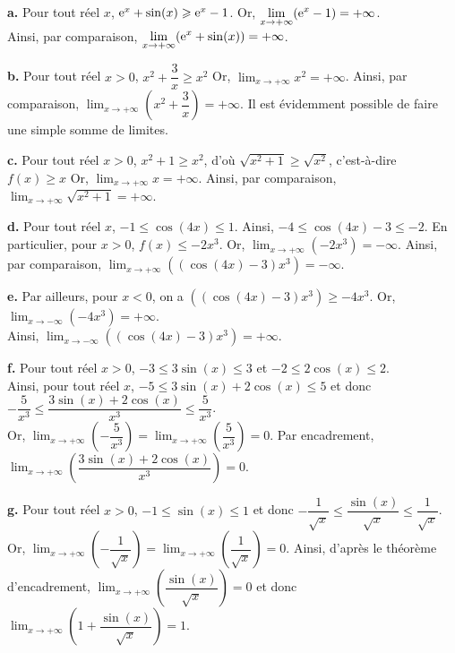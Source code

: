\documentclass[11pt,fleqn, openany]{book} %
\begin{document}
\begin{solution}\textbf{a.} Pour tout réel $x$, $\mathrm{e}^x+\sin(x) \geqslant \mathrm{e}^x -1$. Or, $\displaystyle \lim_{x \to + \infty}(\mathrm{e}^x-1)=+\infty$.\\ Ainsi, par comparaison, $\displaystyle \lim _{x\to + \infty}(\mathrm{e}^x + \sin (x))=+\infty$.

 \textbf{b.} Pour tout réel $x>0$, $x^2+\dfrac{3}{x}\geqslant x^2$ Or, $\displaystyle \lim_{x \to +\infty}x^2=+\infty$. Ainsi, par comparaison, $\displaystyle \lim_{x \to +\infty} \left(x^2+\dfrac{3}{x}\right)=+\infty$. Il est évidemment possible de faire une simple somme de limites. 

 \textbf{c.} Pour tout réel $x>0$, $x^2+1 \geqslant x^2$, d'où $\sqrt{x^2+1} \geqslant \sqrt{x^2}$, c'est-à-dire $f(x)\geqslant x$ Or, $\displaystyle \lim_{x \to +\infty}x=+\infty$. Ainsi, par comparaison, $\displaystyle \lim_{x \to +\infty} \sqrt{x^2+1}=+\infty$.
 
  \textbf{d.} Pour tout réel $x$, $-1\leqslant \cos(4x) \leqslant 1$. Ainsi, $-4 \leqslant \cos(4x)-3 \leqslant -2$. En particulier, pour $x>0$, $f(x) \leqslant -2x^3$. Or, $\displaystyle\lim _{x \to +\infty} (-2x^3)=-\infty$. Ainsi, par comparaison,  $\displaystyle \lim_{x \to +\infty} \left((\cos(4x)-3)x^3\right)=-\infty$.

 \textbf{e.} Par ailleurs, pour $x<0$, on a $\left((\cos(4x)-3)x^3\right) \geqslant -4x^3$. Or, $\displaystyle \lim_{x \to -\infty} (-4x^3)=+\infty$.\\ Ainsi, $\displaystyle \lim_{x \to -\infty} \left((\cos(4x)-3)x^3\right)=+\infty$.

 \textbf{f.} Pour tout réel $x>0$, $-3  \leqslant 3\sin(x) \leqslant 3$ et $-2\leqslant 2\cos(x)\leqslant 2$. \\ Ainsi, pour tout réel $x$, $-5\leqslant 3\sin(x)+2\cos(x) \leqslant 5$ et donc $-\dfrac{5}{x^3} \leqslant \dfrac{3\sin(x)+2\cos(x)}{x^3} \leqslant \dfrac{5}{x^3}$. \\ Or, $\displaystyle\lim_{x\to+\infty}\left(-\dfrac{5}{x^3}\right) = \displaystyle\lim_{x\to+\infty}\left(\dfrac{5}{x^3}\right)=0$. Par encadrement, $\displaystyle\lim_{x\to+\infty}\left(\dfrac{3\sin(x)+2\cos(x)}{x^3}\right)=0$.
 
\textbf{g.} Pour tout réel $x>0$, $-1 \leqslant \sin(x) \leqslant 1$ et donc $-\dfrac{1}{\sqrt{x}} \leqslant \dfrac{\sin(x)}{\sqrt{x}} \leqslant \dfrac{1}{\sqrt{x}}$. \\ Or, $\displaystyle\lim_{x\to+\infty}\left(-\dfrac{1}{\sqrt{x}}\right)=\displaystyle\lim_{x\to+\infty}\left(\dfrac{1}{\sqrt{x}}\right)=0$. Ainsi, d'après le théorème d'encadrement, $\displaystyle\lim_{x\to+\infty}\left(\dfrac{\sin(x)}{\sqrt{x}}\right)=0$ et donc $\displaystyle\lim_{x\to+\infty}\left(1+\dfrac{\sin(x)}{\sqrt{x}}\right)=1$.
  

\end{solution}
\end{document}
